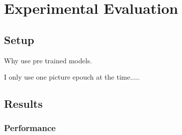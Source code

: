 
\section{Experimental Evaluation}
\subsection{Setup}




Why use pre trained models.


I only use one picture epouch at the time.....


\subsection{Results}
\label{subsec:results}

\subsubsection{Performance}


